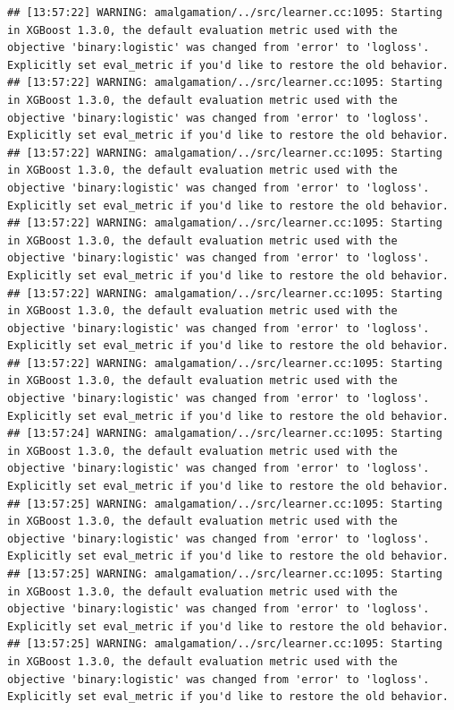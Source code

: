\documentclass[
]{scrbook}
\begin{document}
\begin{verbatim}
## [13:57:22] WARNING: amalgamation/../src/learner.cc:1095: Starting in XGBoost 1.3.0, the default evaluation metric used with the objective 'binary:logistic' was changed from 'error' to 'logloss'. Explicitly set eval_metric if you'd like to restore the old behavior.
## [13:57:22] WARNING: amalgamation/../src/learner.cc:1095: Starting in XGBoost 1.3.0, the default evaluation metric used with the objective 'binary:logistic' was changed from 'error' to 'logloss'. Explicitly set eval_metric if you'd like to restore the old behavior.
## [13:57:22] WARNING: amalgamation/../src/learner.cc:1095: Starting in XGBoost 1.3.0, the default evaluation metric used with the objective 'binary:logistic' was changed from 'error' to 'logloss'. Explicitly set eval_metric if you'd like to restore the old behavior.
## [13:57:22] WARNING: amalgamation/../src/learner.cc:1095: Starting in XGBoost 1.3.0, the default evaluation metric used with the objective 'binary:logistic' was changed from 'error' to 'logloss'. Explicitly set eval_metric if you'd like to restore the old behavior.
## [13:57:22] WARNING: amalgamation/../src/learner.cc:1095: Starting in XGBoost 1.3.0, the default evaluation metric used with the objective 'binary:logistic' was changed from 'error' to 'logloss'. Explicitly set eval_metric if you'd like to restore the old behavior.
## [13:57:22] WARNING: amalgamation/../src/learner.cc:1095: Starting in XGBoost 1.3.0, the default evaluation metric used with the objective 'binary:logistic' was changed from 'error' to 'logloss'. Explicitly set eval_metric if you'd like to restore the old behavior.
## [13:57:24] WARNING: amalgamation/../src/learner.cc:1095: Starting in XGBoost 1.3.0, the default evaluation metric used with the objective 'binary:logistic' was changed from 'error' to 'logloss'. Explicitly set eval_metric if you'd like to restore the old behavior.
## [13:57:25] WARNING: amalgamation/../src/learner.cc:1095: Starting in XGBoost 1.3.0, the default evaluation metric used with the objective 'binary:logistic' was changed from 'error' to 'logloss'. Explicitly set eval_metric if you'd like to restore the old behavior.
## [13:57:25] WARNING: amalgamation/../src/learner.cc:1095: Starting in XGBoost 1.3.0, the default evaluation metric used with the objective 'binary:logistic' was changed from 'error' to 'logloss'. Explicitly set eval_metric if you'd like to restore the old behavior.
## [13:57:25] WARNING: amalgamation/../src/learner.cc:1095: Starting in XGBoost 1.3.0, the default evaluation metric used with the objective 'binary:logistic' was changed from 'error' to 'logloss'. Explicitly set eval_metric if you'd like to restore the old behavior.

\end{verbatim}
\end{document}
